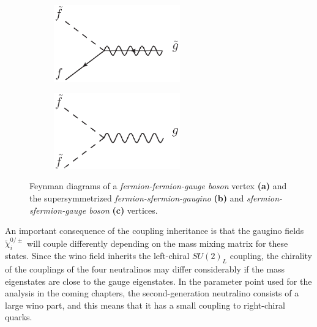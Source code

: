 \documentclass[twoside,english]{uiofysmaster}
\begin{document}
\begin{figure}[htbp]
	\begin{subfigure}[b]{0.45\textwidth}
		\centering
		\includegraphics[width=0.6\textwidth]{figures/susyintro/sfg_vertex.eps}
		\caption{ }
		\label{fig:feynmandiagram_supersymmetrization_b}
	\end{subfigure}
	\begin{subfigure}[b]{0.45\textwidth}
		\centering
		\includegraphics[width=0.6\textwidth]{figures/susyintro/ssg_vertex.eps}
		\caption{ }
		\label{fig:feynmandiagram_supersymmetrization_c}
	\end{subfigure}
	\caption{Feynman diagrams of a {\it fermion-fermion-gauge boson} vertex {\bf (a)} and the supersymmetrized {\it fermion-sfermion-gaugino} {\bf (b)} and {\it sfermion-sfermion-gauge boson} {\bf (c)} vertices.}
	\label{fig:feynmandiagram_supersymmetrization}
\end{figure}

An important consequence of the coupling inheritance is that the gaugino fields $\tilde\chi_i^{0/\pm}$ will couple differently depending on the mass mixing matrix for these states. Since the wino field inherits the left-chiral $SU(2)_L$ coupling, the chirality of the couplings of the four neutralinos may differ considerably if the mass eigenstates are close to the gauge eigenstates. In the parameter point used for the analysis in the coming chapters, the second-generation neutralino consists of a large wino part, and this means that it has a small coupling to right-chiral quarks. 
\end{document}
